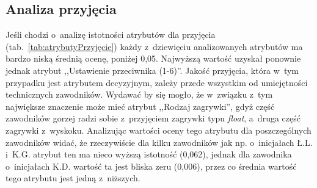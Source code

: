 \documentclass[a4paper,twoside,12pt]{book}
\newcommand{\obcy}[1]{\emph{#1}}
\renewcommand{\ang}[1]{{\selectlanguage{british}\obcy{#1}}}
\begin{document}
\subsection{Analiza przyjęcia}

Jeśli chodzi o~analizę istotności atrybutów dla przyjęcia (tab.~\ref{tab:atrybutyPrzyjęcie}) każdy z~dziewięciu analizowanych atrybutów ma bardzo niską średnią ocenę, poniżej 0,05. Najwyższą wartość uzyskał ponownie jednak atrybut ,,Ustawienie przeciwnika (1-6)''. Jakość przyjęcia, która w~tym przypadku jest atrybutem decyzyjnym, zależy przede wszystkim od umiejętności technicznych zawodników. Wydawać by się mogło, że w~związku z~tym największe znaczenie może mieć atrybut ,,Rodzaj zagrywki'', gdyż część zawodników gorzej radzi sobie z~przyjęciem zagrywki typu \ang{float}, a~druga część zagrywki z~wyskoku. Analizując wartości oceny tego atrybutu dla poszczególnych zawodników widać, że rzeczywiście dla kilku zawodników jak np. o~inicjałach  Ł.L. i~K.G. atrybut ten ma nieco wyższą istotność (0,062), jednak dla zawodnika o~inicjałach K.D. wartość ta jest bliska zeru (0,006), przez co średnia wartość tego atrybutu jest jedną z~niższych.
\end{document}
